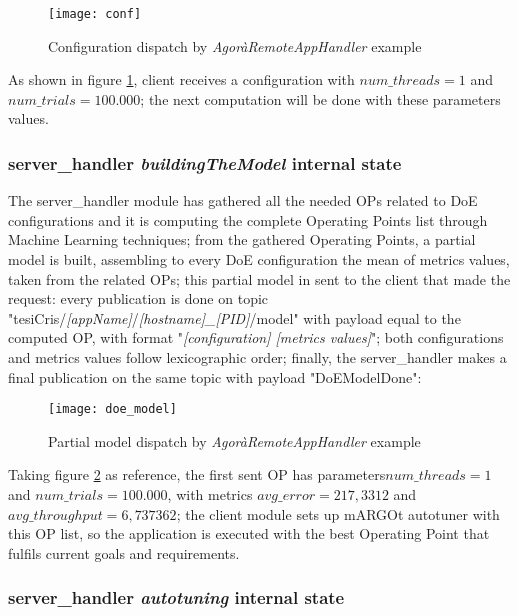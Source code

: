 \begin{figure}[H]

    \centering
    \texttt{[image: conf]}
    \caption{Configuration dispatch by \textit{AgoràRemoteAppHandler} example}
    \label{fig:conf}
    
\end{figure}

As shown in figure \ref{fig:conf}, client receives a configuration with $num\_threads = 1$ and $num\_trials = 100.000$; the next computation will be done with these parameters values.


\subsubsection{server\_handler \textit{buildingTheModel} internal state}\label{DoEModelSend}

The server\_handler module has gathered all the needed OPs related to DoE configurations and it is computing the complete Operating Points list through Machine Learning techniques; from the gathered Operating Points, a partial model is built, assembling to every DoE configuration the mean of metrics values, taken from the related OPs; this partial model in sent to the client that made the request: every publication is done on topic "tesiCris/\textit{[appName]}/\textit{[hostname]\_[PID]}/model" with payload equal to the computed OP, with format "\textit{[configuration] [metrics values]}"; both configurations and metrics values follow lexicographic order; finally, the server\_handler makes a final publication on the same topic with payload "DoEModelDone":

\begin{figure}[H]

    \centering
    \texttt{[image: doe\_model]}
    \caption{Partial model dispatch by \textit{AgoràRemoteAppHandler} example}
    \label{fig:doe_model}
    
\end{figure}

Taking figure \ref{fig:doe_model} as reference, the first sent OP has parameters\linebreak $num\_threads = 1$ and $num\_trials = 100.000$, with metrics $avg\_error = 217,3312$ and $avg\_throughput = 6,737362$; the client module sets up mARGOt autotuner with this OP list, so the application is executed with the best Operating Point that fulfils current goals and requirements.

\subsubsection{server\_handler \textit{autotuning} internal state}\label{modelSend}

